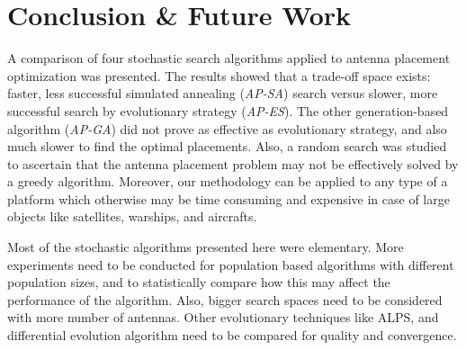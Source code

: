 \documentclass{sig-alternate}
\begin{document}
\section{Conclusion \& Future Work}
\label{sec-conclusion}
A comparison of four stochastic search algorithms applied to antenna placement optimization was presented. The results showed that a trade-off space exists: faster, less successful simulated annealing (\textit{AP-SA}) search versus slower, more successful search by evolutionary strategy (\textit{AP-ES}). The other generation-based algorithm (\textit{AP-GA}) did not prove as effective as evolutionary strategy, and also much slower to find the optimal placements. Also, a random search was studied to ascertain that the antenna placement problem may not be effectively solved by a greedy algorithm. Moreover, our methodology can be applied to any type of a platform which otherwise may be time consuming and expensive in case of large objects like satellites, warships, and aircrafts. 

Most of the stochastic algorithms presented here were elementary. More experiments need to be conducted for population based algorithms with different population sizes, and to statistically compare how this may affect the performance of the algorithm. Also, bigger search spaces need to be considered with more number of antennas. Other evolutionary techniques like ALPS, and differential evolution algorithm need to be compared for quality and convergence.


 
\end{document}
